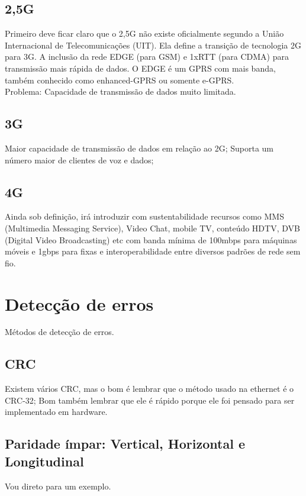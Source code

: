 \documentclass{article}
\begin{document}
\subsection{2,5G}
Primeiro deve ficar claro que o 2,5G não existe oficialmente segundo a União
Internacional de Telecomunicações (UIT). Ela define a transição de tecnologia 2G
para 3G. A inclusão da rede EDGE (para GSM) e 1xRTT (para CDMA) para transmissão
mais rápida de dados. O EDGE é um GPRS com mais banda, também conhecido como
enhanced-GPRS ou somente e-GPRS.\\
Problema: Capacidade de transmissão de dados muito limitada.

\subsection{3G}
Maior capacidade de transmissão de dados em relação ao 2G; Suporta um número
maior de clientes de voz e dados;

\subsection{4G}
Ainda sob definição, irá introduzir com sustentabilidade recursos como MMS
(Multimedia Messaging Service), Video Chat, mobile TV, conteúdo HDTV, DVB
(Digital Video Broadcasting) etc com banda mínima de 100mbps para máquinas
móveis e 1gbps para fixas e interoperabilidade entre diversos padrões de rede
sem fio.

\section{Detecção de erros}
Métodos de detecção de erros.

\subsection{CRC}
Existem vários CRC, mas o bom é lembrar que o método usado na ethernet é o CRC-32; Bom também lembrar que ele é rápido porque ele foi pensado para ser implementado em hardware.

\subsection{Paridade ímpar: Vertical, Horizontal e Longitudinal}
Vou direto para um exemplo.
\end{document}
